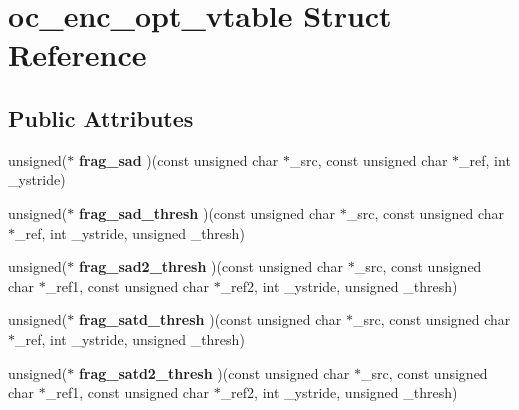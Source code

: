 \hypertarget{structoc__enc__opt__vtable}{\section{oc\+\_\+enc\+\_\+opt\+\_\+vtable Struct Reference}
\label{structoc__enc__opt__vtable}
}
\subsection*{Public Attributes}
\begin{DoxyCompactItemize}
\item 
\hypertarget{structoc__enc__opt__vtable_a5ac7221065d9fce470687d7ee25b0559}{unsigned($\ast$ {\bfseries frag\+\_\+sad} )(const unsigned char $\ast$\+\_\+src, const unsigned char $\ast$\+\_\+ref, int \+\_\+ystride)}\label{structoc__enc__opt__vtable_a5ac7221065d9fce470687d7ee25b0559}

\item 
\hypertarget{structoc__enc__opt__vtable_af92f0c4590a4a7b6e5cfbbccf62a88fe}{unsigned($\ast$ {\bfseries frag\+\_\+sad\+\_\+thresh} )(const unsigned char $\ast$\+\_\+src, const unsigned char $\ast$\+\_\+ref, int \+\_\+ystride, unsigned \+\_\+thresh)}\label{structoc__enc__opt__vtable_af92f0c4590a4a7b6e5cfbbccf62a88fe}

\item 
\hypertarget{structoc__enc__opt__vtable_a3c000c066e7d7b73cb3fafd8a80bb32e}{unsigned($\ast$ {\bfseries frag\+\_\+sad2\+\_\+thresh} )(const unsigned char $\ast$\+\_\+src, const unsigned char $\ast$\+\_\+ref1, const unsigned char $\ast$\+\_\+ref2, int \+\_\+ystride, unsigned \+\_\+thresh)}\label{structoc__enc__opt__vtable_a3c000c066e7d7b73cb3fafd8a80bb32e}

\item 
\hypertarget{structoc__enc__opt__vtable_ab861dd2838c636b393fcddde86a09ed4}{unsigned($\ast$ {\bfseries frag\+\_\+satd\+\_\+thresh} )(const unsigned char $\ast$\+\_\+src, const unsigned char $\ast$\+\_\+ref, int \+\_\+ystride, unsigned \+\_\+thresh)}\label{structoc__enc__opt__vtable_ab861dd2838c636b393fcddde86a09ed4}

\item 
\hypertarget{structoc__enc__opt__vtable_a41250427bbf41190b54353dbfacc5ba3}{unsigned($\ast$ {\bfseries frag\+\_\+satd2\+\_\+thresh} )(const unsigned char $\ast$\+\_\+src, const unsigned char $\ast$\+\_\+ref1, const unsigned char $\ast$\+\_\+ref2, int \+\_\+ystride, unsigned \+\_\+thresh)}\label{structoc__enc__opt__vtable_a41250427bbf41190b54353dbfacc5ba3}


\end{DoxyCompactItemize}
